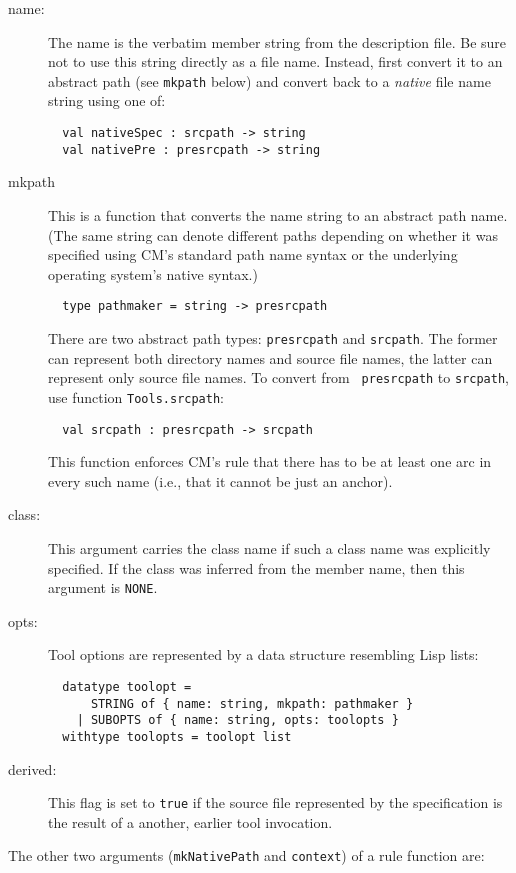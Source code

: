 \begin{description}
\item[name:] The name is the verbatim member string from the
description file.  Be sure not to use this string directly as a file
name.  Instead, first convert it to an abstract path (see {\tt mkpath}
below) and convert back to a {\em native} file name string using one
of:
\begin{verbatim}
  val nativeSpec : srcpath -> string
  val nativePre : presrcpath -> string
\end{verbatim}
\item[mkpath] This is a function that converts the name string to an
abstract path name.  (The same string can denote different paths
depending on whether it was specified using CM's standard path name
syntax or the underlying operating system's native syntax.)
\begin{verbatim}
  type pathmaker = string -> presrcpath
\end{verbatim}
There are two abstract path types: {\tt presrcpath} and {\tt srcpath}.
The former can represent both directory names and source file names,
the latter can represent only source file names.  To convert from {\tt
presrcpath} to {\tt srcpath}, use function {\tt Tools.srcpath}:
\begin{verbatim}
  val srcpath : presrcpath -> srcpath
\end{verbatim}
This function enforces CM's rule that there has to be at least one arc
in every such name (i.e., that it cannot be just an anchor).
\item[class:] This argument carries the class name if such a class
name was explicitly specified.  If the class was inferred from the
member name, then this argument is {\tt NONE}.
\item[opts:] Tool options are represented by a data structure
resembling Lisp lists:
\begin{verbatim}
  datatype toolopt =
      STRING of { name: string, mkpath: pathmaker }
    | SUBOPTS of { name: string, opts: toolopts }
  withtype toolopts = toolopt list
\end{verbatim}
\item[derived:] This flag is set to {\tt true} if the source file
represented by the specification is the result of a another, earlier
tool invocation.
\end{description}

The other two arguments ({\tt mkNativePath} and {\tt context}) of a
rule function are:

